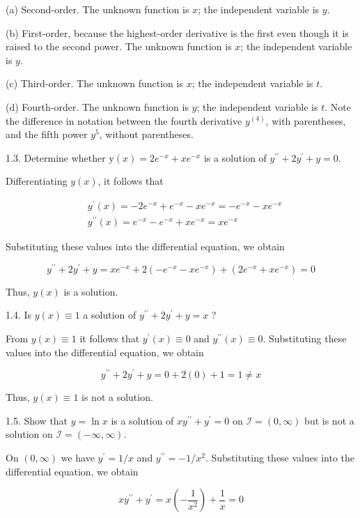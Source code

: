 \documentclass[10pt]{article}
\begin{document}
(a) Second-order. The unknown function is $x$; the independent variable is $y$.

(b) First-order, because the highest-order derivative is the first even though it is raised to the second power. The unknown function is $x$; the independent variable is $y$.

(c) Third-order. The unknown function is $x$; the independent variable is $t$.

(d) Fourth-order. The unknown function is $y$; the independent variable is $t$. Note the difference in notation between the fourth derivative $y^{(4)}$, with parentheses, and the fifth power $y^{5}$, without parentheses.

1.3. Determine whether $\mathrm{y}(x)=2 e^{-x}+x e^{-x}$ is a solution of $y^{\prime \prime}+2 y^{\prime}+y=0$.

Differentiating $y(x)$, it follows that

$$
\begin{aligned}
& y^{\prime}(x)=-2 e^{-x}+e^{-x}-x e^{-x}=-e^{-x}-x e^{-x} \\
& y^{\prime \prime}(x)=e^{-x}-e^{-x}+x e^{-x}=x e^{-x}
\end{aligned}
$$

Substituting these values into the differential equation, we obtain

$$
y^{\prime \prime}+2 y^{\prime}+y=x e^{-x}+2\left(-e^{-x}-x e^{-x}\right)+\left(2 e^{-x}+x e^{-x}\right)=0
$$

Thus, $y(x)$ is a solution.

1.4. Is $y(x) \equiv 1$ a solution of $y^{\prime \prime}+2 y^{\prime}+y=x$ ?

From $y(x) \equiv 1$ it follows that $y^{\prime}(x) \equiv 0$ and $y^{\prime \prime}(x) \equiv 0$. Substituting these values into the differential equation, we obtain

$$
y^{\prime \prime}+2 y^{\prime}+y=0+2(0)+1=1 \neq x
$$

Thus, $y(x) \equiv 1$ is not a solution.

1.5. Show that $y=\ln x$ is a solution of $x y^{\prime \prime}+y^{\prime}=0$ on $\mathscr{I}=(0, \infty)$ but is not a solution on $\mathscr{I}=(-\infty, \infty)$.

On $(0, \infty)$ we have $y^{\prime}=1 / x$ and $y^{\prime \prime}=-1 / x^{2}$. Substituting these values into the differential equation, we obtain

$$
x y^{\prime \prime}+y^{\prime}=x\left(-\frac{1}{x^{2}}\right)+\frac{1}{x}=0
$$
\end{document}

